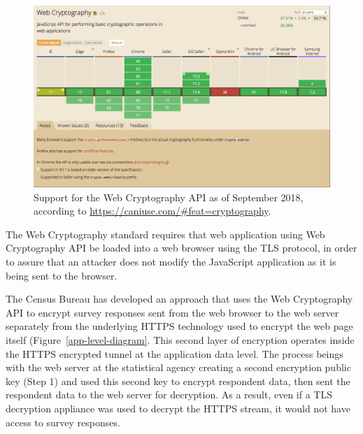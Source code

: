 \documentclass[fleqn,10pt]{wlscirep}
\begin{document}
\begin{figure}
  \includegraphics[width=\linewidth]{art/caniuse}
  \caption{Support for the Web Cryptography API as of September 2018,
    according to \url{https://caniuse.com/\#feat=cryptography}.\label{caniuse}}
\end{figure}

The Web Cryptography standard requires that web application using Web
Cryptography API be loaded into a web browser using the TLS protocol, in
order to assure that an attacker does not modify the JavaScript
application as it is being sent to the browser.

The Census Bureau has developed an approach that uses the Web
Cryptography API to encrypt survey responses sent from the
web browser to the web server separately from the underlying HTTPS
technology used to encrypt the web page itself (Figure~\ref{app-level-diagram}. This second layer of encryption
operates inside the HTTPS encrypted tunnel at the application data
level. The process beings with the web server at the statistical
agency creating a second encryption public key (Step 1) and used this second
key to encrypt respondent data, then sent the respondent data to the
web server for decryption. As a result, even if a TLS decryption
appliance was used to decrypt the HTTPS stream, it would not have
access to survey responses.
\end{document}
